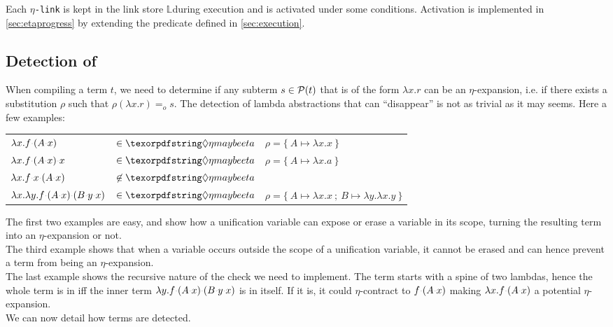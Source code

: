 \documentclass[sigconf,natbib=false,review]{acmart}
\newcommand{\appsep}{\ensuremath{\textcolor{lightgray}{\cdot}}}
\newcommand{\EqualRel}{\ensuremath{=}}
\newcommand{\Eo}{\ensuremath{\EqualRel_o}\xspace}
\newcommand{\linkMacro}[1]{\ensuremath{#1}\texttt{-link}\xspace}
\newcommand{\linketa} {\linkMacro{\eta}}
\newcommand{\linkStore}{\texorpdfstring{\ensuremath{\mathbb{L}}\xspace}{L}}
\begin{document}
Each \linketa is kept in the link store \linkStore during execution
and is activated under some conditions.
Activation is implemented
in \cref{sec:etaprogress}
by extending the 
predicate defined in \cref{sec:execution}.

\subsection{Detection of \maybeeta}\label{sec:etadetection}

When compiling a term $t$, we need to determine if any
subterm $s \in \mathcal{P}(t)$ that is of the form $\lambda x. r$
can be an $\eta$-expansion, i.e. if
there exists a substitution $\rho$ such that $\rho (\lambda x.r) \Eo s$.
The detection of lambda abstractions that can ``disappear''
is not as trivial as it may seems. Here a few examples:
%
\begin{center}
  \begin{tabular}{lll}
    $\lambda x. f \appsep (A \appsep x)$ & $\in\maybeeta$ & $\rho = \{~ A \mapsto \lambda x.x ~\}$ \\
    $\lambda x. f \appsep (A \appsep x) \appsep x$ & $\in\maybeeta$ & $\rho = \{~ A \mapsto \lambda x.a ~\}$\\
    $\lambda x. f \appsep x \appsep (A \appsep x)$ & $\not\in\maybeeta$ &\\
    $\lambda x. \lambda y. f \appsep (A \appsep x) \appsep (B \appsep y \appsep x)$ & $\in\maybeeta$ & $\rho = \{~ A \mapsto \lambda x.x~;~ B \mapsto \lambda y.\lambda x.y ~\}$
  \end{tabular}
\end{center}
\vspace{4pt}

\noindent
The first two examples are easy, and show how a unification variable can expose
or erase a variable in its scope, turning the resulting term into an $\eta$-expansion or not.\\
The third example shows that when a variable occurs outside the scope of a unification
variable, it cannot be erased and can hence prevent a term from being an $\eta$-expansion.\\
The last example shows the recursive nature of the check we need to implement.
The term starts with a spine of two lambdas, hence the whole term
is in \maybeeta iff the inner term $\lambda y.f\appsep (A \appsep x) \appsep (B \appsep y \appsep x)$
is in \maybeeta itself. If it is, it could $\eta$-contract to
$f \appsep (A \appsep x)$ making $\lambda x.f \appsep (A \appsep x)$ a potential
$\eta$-expansion.\\
We can now detail how \maybeeta terms are detected.
\end{document}
